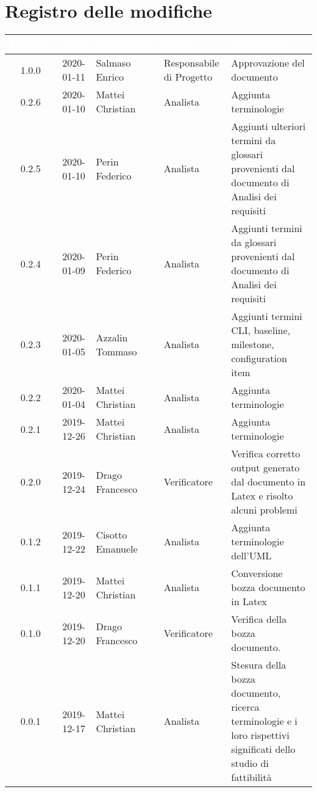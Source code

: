 \section*{Registro delle modifiche}
{
\renewcommand{\arraystretch}{1.5}
\centering
\begin{longtable}{ c c  C{4cm}  C{3cm} C{4cm}}
\textcolor{white}{\textbf{Versione}} & \textcolor{white}{\textbf{Data}} & \textcolor{white}{\textbf{Nominativo}} & \textcolor{white}{\textbf{Ruolo}} & \textcolor{white}{\textbf{Descrizione}}\\	
\endhead


1.0.0 & 2020-01-11 & Salmaso Enrico & Responsabile di Progetto & Approvazione del documento \\

0.2.6 & 2020-01-10 & Mattei Christian & Analista & Aggiunta terminologie \\

0.2.5 & 2020-01-10 & Perin Federico & Analista & Aggiunti ulteriori termini da glossari provenienti dal documento di Analisi dei requisiti \\

0.2.4 & 2020-01-09 & Perin Federico & Analista & Aggiunti termini da glossari provenienti dal documento di Analisi dei requisiti \\

0.2.3 & 2020-01-05 & Azzalin Tommaso & Analista & Aggiunti termini CLI, baseline, milestone, configuration item \\

0.2.2 & 2020-01-04 & Mattei Christian & Analista & Aggiunta terminologie \\

0.2.1 & 2019-12-26 & Mattei Christian & Analista & Aggiunta terminologie \\

0.2.0 & 2019-12-24 & Drago Francesco & Verificatore & Verifica corretto output generato dal documento in Latex e risolto alcuni problemi\\

0.1.2 & 2019-12-22 & Cisotto Emanuele & Analista & Aggiunta terminologie dell'UML \\

0.1.1 & 2019-12-20 & Mattei Christian & Analista & Conversione bozza documento in Latex\\
		
0.1.0 & 2019-12-20 & Drago Francesco & Verificatore & Verifica della bozza documento.  \\
		
0.0.1 & 2019-12-17 & Mattei Christian & Analista & Stesura della bozza documento, ricerca terminologie e i loro rispettivi significati dello studio di fattibilità \\
		
\end{longtable}
}